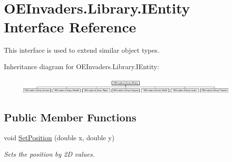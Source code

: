 \hypertarget{interface_o_e_invaders_1_1_library_1_1_i_entity}{}\section{O\+E\+Invaders.\+Library.\+I\+Entity Interface Reference}
\label{interface_o_e_invaders_1_1_library_1_1_i_entity}


This interface is used to extend similar object types.  


Inheritance diagram for O\+E\+Invaders.\+Library.\+I\+Entity\+:\begin{figure}[H]
\begin{center}
\leavevmode
\includegraphics[height=0.869565cm]{interface_o_e_invaders_1_1_library_1_1_i_entity}
\end{center}
\end{figure}
\subsection*{Public Member Functions}
\begin{DoxyCompactItemize}
\item 
void \mbox{\hyperlink{interface_o_e_invaders_1_1_library_1_1_i_entity_ae2cf61539ba662a6793fef01abcad2ef}{Set\+Position}} (double x, double y)
\begin{DoxyCompactList}\small\item\em Sets the position by 2D values. \end{DoxyCompactList}\end{DoxyCompactItemize}
